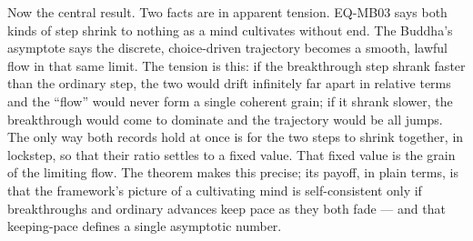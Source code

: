 \documentclass[12pt, a4paper]{article}
\begin{document}
Now the central result. Two facts are in apparent tension. EQ-MB03 says
both kinds of step shrink to nothing as a mind cultivates without end. The
Buddha's asymptote says the discrete, choice-driven trajectory becomes a
smooth, lawful flow in that same limit. The tension is this: if the
breakthrough step shrank faster than the ordinary step, the two would
drift infinitely far apart in relative terms and the ``flow'' would never
form a single coherent grain; if it shrank slower, the breakthrough would
come to dominate and the trajectory would be all jumps. The only way both
records hold at once is for the two steps to shrink together, in lockstep,
so that their ratio settles to a fixed value. That fixed value is the
grain of the limiting flow. The theorem makes this precise; its payoff,
in plain terms, is that the framework's picture of a cultivating mind is
self-consistent only if breakthroughs and ordinary advances keep pace as
they both fade --- and that keeping-pace defines a single asymptotic
number.
\end{document}
